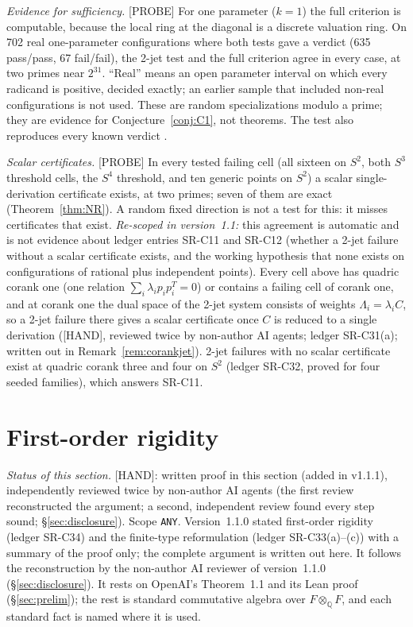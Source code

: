 \documentclass[11pt]{amsart}
\newcommand{\st}[1]{\textsf{[#1]}}
\newcommand{\Q}{\mathbb{Q}}
\theoremstyle{plain}
\theoremstyle{definition}
\begin{document}
\noindent\emph{Evidence for sufficiency.} \st{PROBE} For one parameter ($k=1$) the full criterion is
computable, because the local ring at the diagonal is a discrete valuation ring. On 702 real
one-parameter configurations where both tests gave a verdict (635 pass/pass, 67 fail/fail), the 2-jet
test and the full criterion agree in every case, at two primes near $2^{31}$. ``Real'' means an open
parameter interval on which every radicand is positive, decided exactly; an earlier sample that included
non-real configurations is not used. These are random specializations modulo a prime; they are evidence
for Conjecture~\ref{conj:C1}, not theorems. The test also reproduces every known verdict
\cite{OAI172,Palvolgyi}.

\noindent\emph{Scalar certificates.} \st{PROBE} In every tested failing cell (all sixteen on $S^2$, both
$S^3$ threshold cells, the $S^4$ threshold, and ten generic points on $S^2$) a scalar single-derivation
certificate exists, at two primes; seven of them are exact (Theorem~\ref{thm:NR}). A random fixed
direction is not a test for this: it misses certificates that exist. \emph{Re-scoped in version~1.1:}
this agreement is automatic and is not evidence about ledger entries SR-C11 and SR-C12 (whether a 2-jet
failure without a scalar certificate exists, and the working hypothesis that none exists on
configurations of rational plus independent points). Every cell above has quadric corank one (one
relation $\sum_i\lambda_ip_ip_i^T=0$) or contains a failing cell of corank one, and at corank one the
dual space of the 2-jet system consists of weights $\Lambda_i=\lambda_iC$, so a 2-jet failure there
gives a scalar certificate once $C$ is reduced to a single derivation (\st{HAND}, reviewed twice by
non-author AI agents; ledger SR-C31(a); written out in Remark~\ref{rem:corankjet}). 2-jet failures with no scalar certificate exist at quadric corank
three and four on $S^2$ (ledger SR-C32, proved for four seeded families), which answers SR-C11.

\section{First-order rigidity}\label{sec:rigidity}

\noindent\emph{Status of this section.} \st{HAND}: written proof in this section (added in v1.1.1),
independently reviewed twice by non-author AI agents (the first review reconstructed the argument; a
second, independent review found every step sound; \S\ref{sec:disclosure}). Scope \texttt{ANY}. Version~1.1.0 stated first-order rigidity (ledger SR-C34) and the
finite-type reformulation (ledger SR-C33(a)--(c)) with a summary of the proof only; the complete argument
is written out here. It follows the reconstruction by the non-author AI reviewer of version~1.1.0
(\S\ref{sec:disclosure}). It rests on OpenAI's Theorem~1.1 and its Lean proof (\S\ref{sec:prelim}); the
rest is standard commutative algebra over $F\otimes_\Q F$, and each standard fact is named where it is
used.
\end{document}
